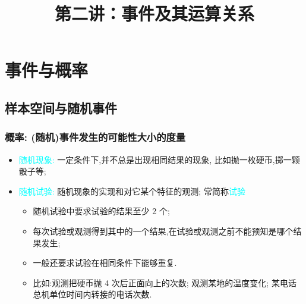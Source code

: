 

\title[概率论]{第二讲：事件及其运算关系}
\date{}


{ 
  \begin{frame}
    \titlepage
  \end{frame}
}

\section{事件与概率}







\subsection{样本空间与随机事件}
\begin{frame}
  \frametitle{概率: (随机)事件发生的可能性大小的度量}
  \begin{itemize}[<+-|alert@+>]
  \item \textcolor{cyan}{随机现象:} 一定条件下,并不总是出现相同结果的现象, 比如抛一枚硬币,掷一颗骰子等;
  \item \textcolor{cyan}{随机试验:} 随机现象的实现和对它某个特征的观测; 常简称\textcolor{cyan}{试验}    \begin{itemize}[<+-|alert@+>]
    \item 随机试验中要求试验的结果至少 2 个;

    \item 每次试验或观测得到其中的一个结果,在试验或观测之前不能预知是哪个结果发生;

    \item 一般还要求试验在相同条件下能够重复.
    \item 比如:观测把硬币抛 4 次后正面向上的次数; 观测某地的温度变化; 某电话总机单位时间内转接的电话次数.
    \end{itemize}
  \end{itemize}
\end{frame}

